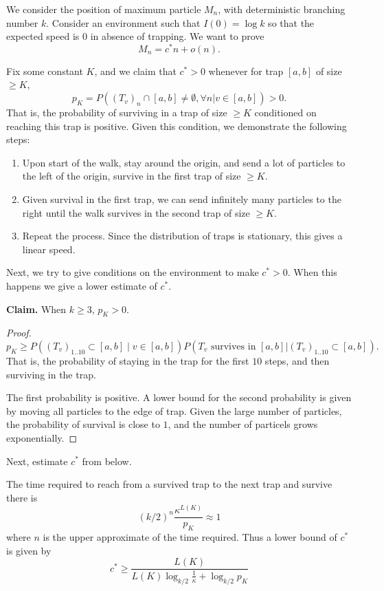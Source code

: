 We consider the position of maximum particle $M_n$, with deterministic branching number $k$. Consider an environment such that $I(0) = \log k$ so that the expected speed is $0$ in absence of trapping. We want to prove
\[
M_n = c^* n + o(n).
\]

Fix some constant $K$, and we claim that $c^* > 0$ whenever for trap $[a,b]$ of size $\geq K$,
\[
    p_K = P((T_{v})_n \cap [a,b] \neq \emptyset, \forall n | v \in [a,b]) > 0.
\]
That is, the probability of surviving in a trap of size $\geq K$ conditioned on reaching this trap is positive. Given this condition, we demonstrate the following steps:
\begin{enumerate}
    \item Upon start of the walk, stay around the origin, and send a lot of particles to the left of the origin, survive in the first trap of size $\geq K$.
    \item Given survival in the first trap, we can send infinitely many particles to the right until the walk survives in the second trap of size $\geq K$.
    \item Repeat the process. Since the distribution of traps is stationary, this gives a linear speed.
\end{enumerate}

Next, we try to give conditions on the environment to make $c^* > 0$. When this happens we give a lower estimate of $c^*$.

\textbf{Claim.} When $k \geq 3$, $p_K > 0$.
\begin{proof}
    \[
    p_K \geq P((T_{v})_{1 .. 10} \subset [a, b] \mid v \in [a, b]) P(T_{v} \text{ survives in }[a,b] | (T_v)_{1 .. 10} \subset [a, b]).
    \]
    That is, the probability of staying in the trap for the first $10$ steps, and then surviving in the trap. 

    The first probability is positive. A lower bound for the second probability is given by moving all particles to the edge of trap. Given the large number of particles, the probability of survival is close to $1$, and the number of particels grows exponentially.
\end{proof}

Next, estimate $c^*$ from below.

The time required to reach from a survived trap to the next trap and survive there is
\[
 (k / 2)^n \frac{\kappa^{L(K)}}{p_K} \approx 1
\]
where $n$ is the upper approximate of the time required. Thus a lower bound of $c^*$ is given by
\[
c^* \geq \frac{L(K)} {L(K) \log_{k / 2} \frac{1}{\kappa}  + \log _{k / 2} p_K}
\]


